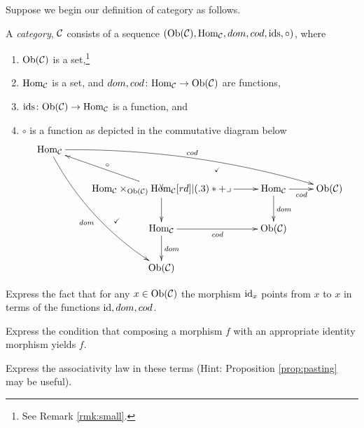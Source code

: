\documentclass[CT4S-EN-RU]{subfiles}
\begin{document}
\begin{exerciseENG}\label{exc:cat in set}
Suppose we begin our definition of category as follows. 

A {\em category}, $\mathcal{C}$ consists of a sequence $(\textnormal{Ob}(\mathcal{C}),\textnormal{Hom}_\mathcal{C},dom,cod,\textnormal{ids},\circ)$, where 
\begin{enumerate}
\item $\textnormal{Ob}(\mathcal{C})$ is a set,\footnote{See Remark \ref{rmk:small}.}
\item $\textnormal{Hom}_\mathcal{C}$ is a set, and $dom,cod\colon\textnormal{Hom}_\mathcal{C}\rightarrow\textnormal{Ob}(\mathcal{C})$ are functions, 
\item $\textnormal{ids}\colon\textnormal{Ob}(\mathcal{C})\rightarrow\textnormal{Hom}_\mathcal{C}$ is a function, and 
\item $\circ$ is a function as depicted in the commutative diagram below
\begin{align}\label{dia:pullback version of cat}
\xymatrix{
\Hom_\mcC\ar@/^1pc/[drrr]^{cod}\ar@/_1pc/[dddr]_{dom}&&\\
&\Hom_\mcC\times_{\Ob(\mcC)}\Hom_\mcC\ar@{}[ur]|{\checkmark}\ar@{}[ddl]|(.4){\checkmark}\ar[ul]_\circ\ar[r]\ar[d]\ullimit&\Hom_\mcC\ar[r]_{cod}\ar[d]^{dom}&\Ob(\mcC)\\
&\Hom_\mcC\ar[r]_{cod}\ar[d]^{dom}&\Ob(\mcC)\\
&\Ob(\mcC)
}
\end{align}
\end{enumerate}

\sexc Express the fact that for any $x\in\textnormal{Ob}(\mathcal{C})$ the morphism $\textnormal{id}_x$ points from $x$ to $x$ in terms of the functions $\textnormal{id},dom,cod$. 
\item Express the condition that composing a morphism $f$ with an appropriate identity morphism yields $f$.
\item Express the associativity law in these terms (Hint: Proposition \ref{prop:pasting} may be useful).
\endsexc
\end{exerciseENG}

\begin{exerciseRUS}\label{exc:cat in set}
\end{exerciseRUS}
\end{document}
